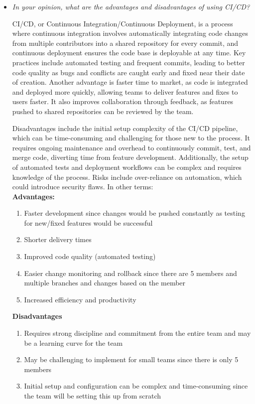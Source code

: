\documentclass{article}
\begin{document}
\begin{itemize}
    \item \textit{In your opinion, what are the advantages and disadvantages of using CI/CD?}
  
    CI/CD, or Continuous Integration/Continuous Deployment, is a process where continuous integration involves automatically integrating code changes from multiple contributors into a shared repository for every commit, and continuous deployment ensures the code base is deployable at any time. Key practices include automated testing and frequent commits, leading to better code quality as bugs and conflicts are caught early and fixed near their date of creation. Another advantage is faster time to market, as code is integrated and deployed more quickly, allowing teams to deliver features and fixes to users faster. It also improves collaboration through feedback, as features pushed to shared repositories can be reviewed by the team.

    Disadvantages include the initial setup complexity of the CI/CD pipeline, which can be time-consuming and challenging for those new to the process. It requires ongoing maintenance and overhead to continuously commit, test, and merge code, diverting time from feature development. Additionally, the setup of automated tests and deployment workflows can be complex and requires knowledge of the process. Risks include over-reliance on automation, which could introduce security flaws.
    In other terms:\\
    \textbf{Advantages:}
    \begin{enumerate}
      \item Faster development since changes would be pushed constantly as testing for new/fixed features would be successful
      \item Shorter delivery times
      \item Improved code quality (automated testing)
      \item Easier change monitoring and rollback since there are 5 members and multiple branches and changes based on the member
      \item Increased efficiency and productivity
    \end{enumerate}
    \textbf{Disadvantages}
    \begin{enumerate}
      \item Requires strong discipline and commitment from the entire team and may be a learning curve for the team
      \item May be challenging to implement for small teams since there is only 5 members
      \item Initial setup and configuration can be complex and time-consuming since the team will be setting this up from scratch
    \end{enumerate}

\end{itemize}
\end{document}
